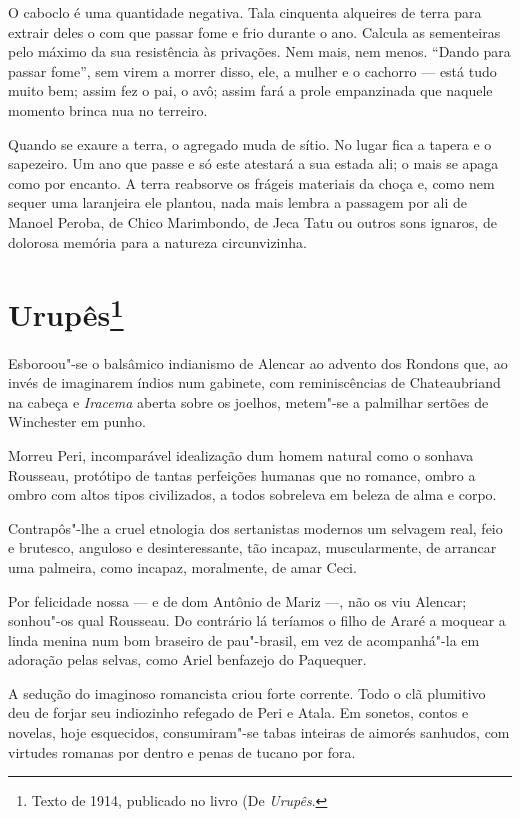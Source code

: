 O caboclo é uma quantidade negativa. Tala cinquenta alqueires de terra
para extrair deles o com que passar fome e frio durante o ano. Calcula
as sementeiras pelo máximo da sua resistência às privações. Nem mais,
nem menos. ``Dando para passar fome'', sem virem a morrer disso, ele, a
mulher e o cachorro --- está tudo muito bem; assim fez o pai, o avô;
assim fará a prole empanzinada que naquele momento brinca nua no
terreiro.

Quando se exaure a terra, o agregado muda de sítio. No lugar fica a
tapera e o sapezeiro. Um ano que passe e só este atestará a sua estada
ali; o mais se apaga como por encanto. A terra reabsorve os frágeis
materiais da choça e, como nem sequer uma laranjeira ele plantou, nada
mais lembra a passagem por ali de Manoel Peroba, de Chico Marimbondo, de
Jeca Tatu ou outros sons ignaros, de dolorosa memória para a natureza
circunvizinha.

\chapter{Urupês\footnote[*]{Texto de 1914, publicado no livro (De \emph{Urupês}.}}

Esboroou"-se o balsâmico indianismo de Alencar ao advento dos Rondons
que, ao invés de imaginarem índios num gabinete, com reminiscências de
Chateaubriand na cabeça e \emph{Iracema} aberta sobre os joelhos,
metem"-se a palmilhar sertões de Winchester em punho.

Morreu Peri, incomparável idealização dum homem natural como o sonhava
Rousseau, protótipo de tantas perfeições humanas que no romance, ombro a
ombro com altos tipos civilizados, a todos sobreleva em beleza de alma e
corpo.

Contrapôs"-lhe a cruel etnologia dos sertanistas modernos um selvagem
real, feio e brutesco, anguloso e desinteressante, tão incapaz,
muscularmente, de arrancar uma palmeira, como incapaz, moralmente, de
amar Ceci.

Por felicidade nossa --- e de dom Antônio de Mariz ---, não os viu
Alencar; sonhou"-os qual Rousseau. Do contrário lá teríamos o filho de
Araré a moquear a linda menina num bom braseiro de pau"-brasil, em vez de
acompanhá"-la em adoração pelas selvas, como Ariel benfazejo do
Paquequer.

A sedução do imaginoso romancista criou forte corrente. Todo o clã
plumitivo deu de forjar seu indiozinho refegado de Peri e Atala. Em
sonetos, contos e novelas, hoje esquecidos, consumiram"-se tabas inteiras
de aimorés sanhudos, com virtudes romanas por dentro e penas de tucano
por fora.

